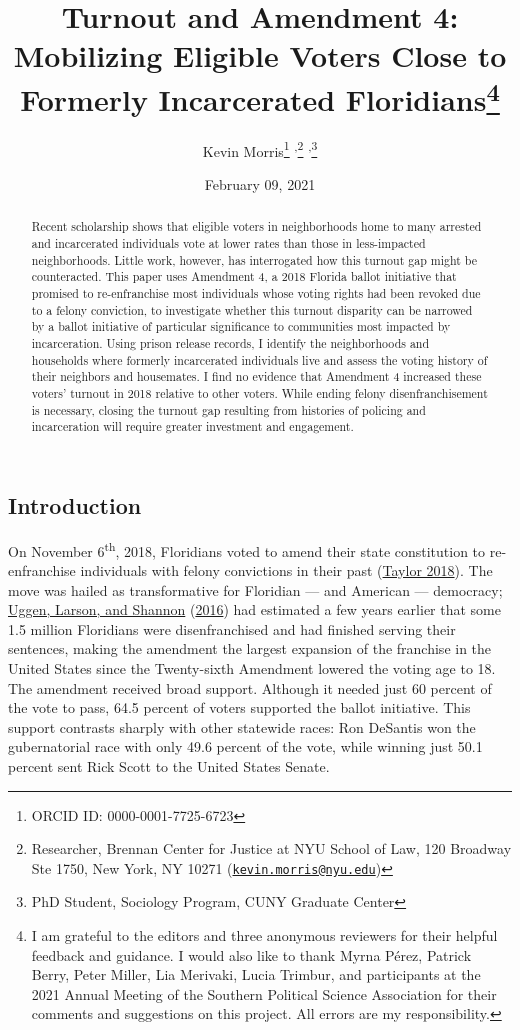 \documentclass[
  12pt,
]{article}
\title{Turnout and Amendment 4: Mobilizing Eligible Voters Close to Formerly Incarcerated Floridians\thanks{I am grateful to the editors and three anonymous reviewers for their helpful feedback and guidance. I would also like to thank Myrna Pérez, Patrick Berry, Peter Miller, Lia Merivaki, Lucia Trimbur, and participants at the 2021 Annual Meeting of the Southern Political Science Association for their comments and suggestions on this project. All errors are my responsibility.}}
\author{Kevin Morris\footnote{ORCID ID: 0000-0001-7725-6723} \textsuperscript{,}\footnote{Researcher, Brennan Center for Justice at NYU School of Law, 120 Broadway Ste 1750, New York, NY 10271 (\href{mailto:kevin.morris@nyu.edu}{\nolinkurl{kevin.morris@nyu.edu}})} \textsuperscript{,}\footnote{PhD Student, Sociology Program, CUNY Graduate Center}}
\date{February 09, 2021}
\begin{document}
\maketitle
\begin{abstract}
Recent scholarship shows that eligible voters in neighborhoods home to many arrested and incarcerated individuals vote at lower rates than those in less-impacted neighborhoods. Little work, however, has interrogated how this turnout gap might be counteracted. This paper uses Amendment 4, a 2018 Florida ballot initiative that promised to re-enfranchise most individuals whose voting rights had been revoked due to a felony conviction, to investigate whether this turnout disparity can be narrowed by a ballot initiative of particular significance to communities most impacted by incarceration. Using prison release records, I identify the neighborhoods and households where formerly incarcerated individuals live and assess the voting history of their neighbors and housemates. I find no evidence that Amendment 4 increased these voters' turnout in 2018 relative to other voters. While ending felony disenfranchisement is necessary, closing the turnout gap resulting from histories of policing and incarceration will require greater investment and engagement.
\end{abstract}

\pagebreak

\doublespacing

\hypertarget{introduction}{%
\subsection*{Introduction}\label{introduction}}

On November 6\textsuperscript{th}, 2018, Floridians voted to amend their state constitution to re-enfranchise individuals with felony convictions in their past (\protect\hyperlink{ref-Taylor2018}{Taylor 2018}). The move was hailed as transformative for Floridian --- and American --- democracy; \protect\hyperlink{ref-sentencing_2016}{Uggen, Larson, and Shannon} (\protect\hyperlink{ref-sentencing_2016}{2016}) had estimated a few years earlier that some 1.5 million Floridians were disenfranchised and had finished serving their sentences, making the amendment the largest expansion of the franchise in the United States since the Twenty-sixth Amendment lowered the voting age to 18. The amendment received broad support. Although it needed just 60 percent of the vote to pass, 64.5 percent of voters supported the ballot initiative. This support contrasts sharply with other statewide races: Ron DeSantis won the gubernatorial race with only 49.6 percent of the vote, while winning just 50.1 percent sent Rick Scott to the United States Senate.
\end{document}

